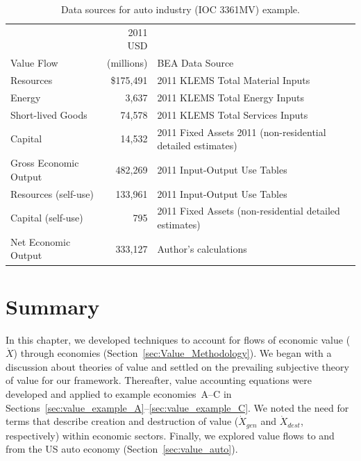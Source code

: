 \begin{table}
\caption[Data Sources for auto industry (IOC 3361MV) example]{Data sources for auto industry (IOC 3361MV) example.}
\begin{center}
  \begin{tabular}{l r @{\hspace{2em}} l}
   \toprule 
     & 2011 USD &   \\ 
Value Flow & (millions) & BEA Data Source \\
	\midrule
    Resources  & \$175,491           & 2011 KLEMS Total Material Inputs \\

   Energy &   3,637&   2011 KLEMS Total Energy Inputs                \\

    Short-lived Goods &   74,578 &   2011 KLEMS Total Services Inputs    \\
    Capital & 14,532  &  2011 Fixed Assets 2011 (non-residential detailed estimates)     \\  

    Gross Economic Output & 482,269  &   2011 Input-Output Use Tables \\

    Resources (self-use)  &  133,961 & 2011 Input-Output Use Tables     \\
    Capital (self-use) & 795 & 2011 Fixed Assets (non-residential detailed estimates)      \\
    Net Economic Output & 333,127   &  Author's calculations \\
    \bottomrule
  \end{tabular}

\end{center}
\label{tab:data}
\end{table}


\section{Summary}
\label{sec:value_summary}

In this chapter, we developed techniques to account for flows of economic value
($\dot{X}$) through economies 
(Section~\ref{sec:Value_Methodology}).
We began with a discussion about theories of value and settled on
the prevailing subjective theory of value for our framework.
Thereafter, value accounting equations were developed and applied to example
economies~A--C %
in Sections~\ref{sec:value_example_A}--\ref{sec:value_example_C}. 
We noted the need for terms that describe creation and destruction
of value ($\dot{X}_{gen}$ and $\dot{X}_{dest}$, respectively) 
within economic sectors.
Finally, we explored value flows 
to and from the US auto economy (Section~\ref{sec:value_auto}).

